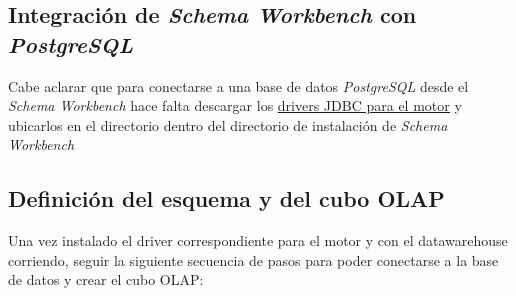 \subsection*{Integración de \emph{Schema Workbench} con \emph{PostgreSQL}}

Cabe aclarar que para conectarse a una base de datos \emph{PostgreSQL} desde el \emph{Schema Workbench} hace falta descargar los \underline{\href{https://jdbc.postgresql.org/}{drivers JDBC para el motor}} y ubicarlos en el directorio  dentro del directorio de instalación de \emph{Schema Workbench} 

\subsection{Definición del esquema y del cubo OLAP}

Una vez instalado el driver correspondiente para el motor y con el datawarehouse corriendo, seguir la siguiente secuencia de pasos para poder conectarse a la base de datos y crear el cubo OLAP:

